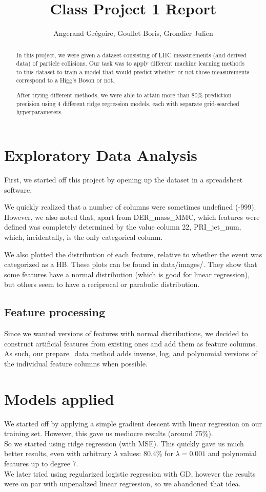 \documentclass[11pt,conference,compsocconf]{IEEEtran}
\begin{document}
\title{Class Project 1 Report}

\author{
  Angerand Gr\'egoire, Goullet Boris, Grondier Julien 
}

\maketitle

\begin{abstract}
In this project, we were given a dataset consisting of LHC measurements (and derived data) of particle collisions. Our task was to apply different machine learning methods to this dataset to train a model that would predict whether or not those measurements correspond to a Higg's Boson or not.

After trying different methods, we were able to attain more than 80\% prediction precision using 4 different ridge regression models, each with separate grid-searched hyperparameters.
\end{abstract}

\section{Exploratory Data Analysis}
First, we started off this project by opening up the dataset in a spreadsheet software.

We quickly realized that a number of columns were sometimes undefined (-999). However, we also noted that, apart from DER\_mass\_MMC, which features were defined was completely determined by the value column 22, PRI\_jet\_num, which, incidentally, is the only categorical column.

We also plotted the distribution of each feature, relative to whether the event was categorized as a HB. These plots can be found in data/images/. They show that some features have a normal distribution (which is good for linear regression), but others seem to have a reciprocal or parabolic distribution.

\subsection*{Feature processing}
Since we wanted versions of features with normal distributions, we decided to construct artificial features from existing ones and add them as feature columns. As such, our prepare\_data method adds inverse, log, and polynomial versions of the individual feature columns when possible.

\section{Models applied}
We started off by applying a simple gradient descent with linear regression on our training set. However, this gave us mediocre results (around 75\%).
\\So we started using ridge regression (with MSE). This quickly gave us much better results, even with arbitrary $\lambda$ values: 80.4\% for $\lambda = 0.001$ and polynomial features up to degree 7.
\\We later tried using regularized logistic regression with GD, however the results were on par with unpenalized linear regression, so we abandoned that idea.
\end{document}
